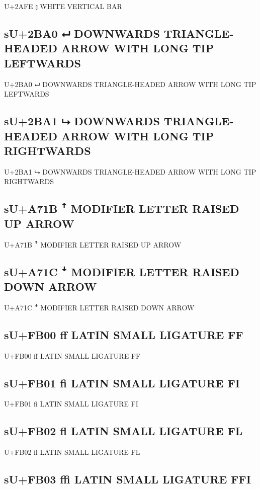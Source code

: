 U+2AFE ⫾ WHITE VERTICAL BAR

\subsection{sU+2BA0 ⮠  DOWNWARDS TRIANGLE-HEADED ARROW WITH LONG TIP LEFTWARDS}

U+2BA0 ⮠  DOWNWARDS TRIANGLE-HEADED ARROW WITH LONG TIP LEFTWARDS

\subsection{sU+2BA1 ⮡ DOWNWARDS TRIANGLE-HEADED ARROW WITH LONG TIP RIGHTWARDS}

U+2BA1 ⮡ DOWNWARDS TRIANGLE-HEADED ARROW WITH LONG TIP RIGHTWARDS

\subsection{sU+A71B ꜛ MODIFIER LETTER RAISED UP ARROW}

U+A71B ꜛ MODIFIER LETTER RAISED UP ARROW

\subsection{sU+A71C ꜜ MODIFIER LETTER RAISED DOWN ARROW}

U+A71C ꜜ MODIFIER LETTER RAISED DOWN ARROW

\subsection{sU+FB00 ﬀ LATIN SMALL LIGATURE FF}

U+FB00 ﬀ LATIN SMALL LIGATURE FF

\subsection{sU+FB01 ﬁ LATIN SMALL LIGATURE FI}

U+FB01 ﬁ LATIN SMALL LIGATURE FI

\subsection{sU+FB02 ﬂ LATIN SMALL LIGATURE FL}

U+FB02 ﬂ LATIN SMALL LIGATURE FL

\subsection{sU+FB03 ﬃ LATIN SMALL LIGATURE FFI}

